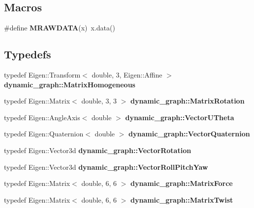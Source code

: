 \subsection*{Macros}
\begin{DoxyCompactItemize}
\item 
\mbox{\label{matrix__geometry_8hh_a57a66b4c84cff81707e398b940e1ef68}} 
\#define {\bfseries M\+R\+A\+W\+D\+A\+TA}(x)~x.\+data()
\end{DoxyCompactItemize}
\subsection*{Typedefs}
\begin{DoxyCompactItemize}
\item 
\mbox{\label{namespacedynamic__graph_a1131a4277bbf44a6821d55f61a81c63e}} 
typedef Eigen\+::\+Transform$<$ double, 3, Eigen\+::\+Affine $>$ {\bfseries dynamic\+\_\+graph\+::\+Matrix\+Homogeneous}
\item 
\mbox{\label{namespacedynamic__graph_ad658deb7372b70df382e1c8317a5a4b4}} 
typedef Eigen\+::\+Matrix$<$ double, 3, 3 $>$ {\bfseries dynamic\+\_\+graph\+::\+Matrix\+Rotation}
\item 
\mbox{\label{namespacedynamic__graph_aabaea0c174dde41c755e8d3fb6d23caa}} 
typedef Eigen\+::\+Angle\+Axis$<$ double $>$ {\bfseries dynamic\+\_\+graph\+::\+Vector\+U\+Theta}
\item 
\mbox{\label{namespacedynamic__graph_a9f22f1c9369a98e94778717faeec3f4b}} 
typedef Eigen\+::\+Quaternion$<$ double $>$ {\bfseries dynamic\+\_\+graph\+::\+Vector\+Quaternion}
\item 
\mbox{\label{namespacedynamic__graph_afe3e8341b18b6a3b59f2fa579c2e12c1}} 
typedef Eigen\+::\+Vector3d {\bfseries dynamic\+\_\+graph\+::\+Vector\+Rotation}
\item 
\mbox{\label{namespacedynamic__graph_af84ad658e1cf7d496958772210dd51b6}} 
typedef Eigen\+::\+Vector3d {\bfseries dynamic\+\_\+graph\+::\+Vector\+Roll\+Pitch\+Yaw}
\item 
\mbox{\label{namespacedynamic__graph_a1ae11b4524182150738a5da5032a94ea}} 
typedef Eigen\+::\+Matrix$<$ double, 6, 6 $>$ {\bfseries dynamic\+\_\+graph\+::\+Matrix\+Force}
\item 
\mbox{\label{namespacedynamic__graph_a137b22553cdabfd25e49fc057fa301d6}} 
typedef Eigen\+::\+Matrix$<$ double, 6, 6 $>$ {\bfseries dynamic\+\_\+graph\+::\+Matrix\+Twist}
\end{DoxyCompactItemize}
